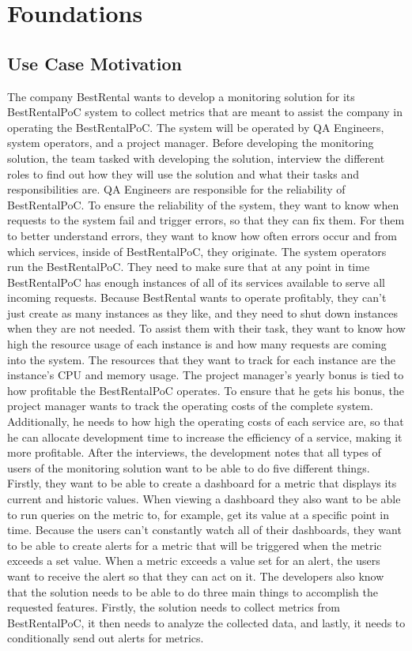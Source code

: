 \chapter{Foundations}
\label{cha:foundations}

\section{Use Case Motivation}

The company BestRental wants to develop a monitoring solution for its BestRentalPoC system
to collect metrics that are meant to assist the company in operating the BestRentalPoC.
The system will be operated by QA Engineers, system operators, and a project manager.
Before developing the monitoring solution, the team tasked with developing the solution,
interview the different roles to find out how they will use the solution
and what their tasks and responsibilities are.
QA Engineers are responsible for the reliability of BestRentalPoC.
To ensure the reliability of the system, they want to know when requests to the system fail and
trigger errors, so that they can fix them.
For them to better understand errors, they want to know how often errors occur and from which services,
inside of BestRentalPoC, they originate.
The system operators run the BestRentalPoC. They need to make sure that at any point in time
BestRentalPoC has enough instances of all of its services available to serve all incoming requests.
Because BestRental wants to operate profitably, they can't just create as many instances as they like,
and they need to shut down instances when they are not needed.
To assist them with their task, they want to know how high the resource usage of each instance is
and how many requests are coming into the system. The resources that they want to track for each
instance are the instance's CPU and memory usage.
The project manager's yearly bonus is tied to how profitable the BestRentalPoC operates.
To ensure that he gets his bonus, the project manager wants to track the operating costs of the complete system.
Additionally, he needs to how high the operating costs of each service are, so that he can
allocate development time to increase the efficiency of a service, making it more profitable.
After the interviews, the development notes that all types of users of the monitoring solution
want to be able to do five different things.
Firstly, they want to be able to create a dashboard for a metric that displays its current and historic values.
When viewing a dashboard they also want to be able to run queries on the metric to, for example, get
its value at a specific point in time.
Because the users can't constantly watch all of their dashboards, they want to be able to create
alerts for a metric that will be triggered when the metric exceeds a set value.
When a metric exceeds a value set for an alert, the users want to receive the alert so that they can act on it.
The developers also know that the solution needs to be able to do three main things to accomplish
the requested features.
Firstly, the solution needs to collect metrics from BestRentalPoC,
it then needs to analyze the collected data, and lastly, it needs to conditionally send out alerts
for metrics.

